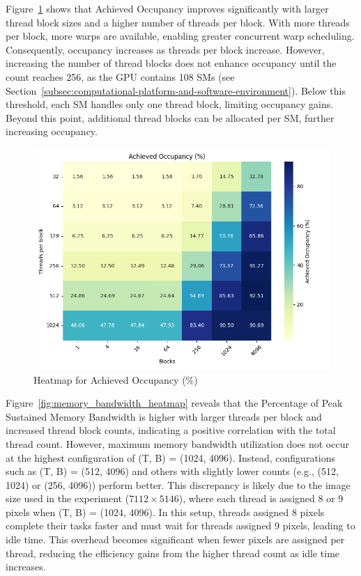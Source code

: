 Figure~\ref{fig:occupancy_heatmap} shows that Achieved Occupancy improves significantly with larger thread block sizes and a higher number of threads per block. With more threads per block, more warps are available, enabling greater concurrent warp scheduling. Consequently, occupancy increases as threads per block increase. However, increasing the number of thread blocks does not enhance occupancy until the count reaches 256, as the GPU contains 108 SMs (see Section~\ref{subsec:computational-platform-and-software-environment}). Below this threshold, each SM handles only one thread block, limiting occupancy gains. Beyond this point, additional thread blocks can be allocated per SM, further increasing occupancy.

\begin{figure}[htbp]
    \includegraphics[width=1.0\linewidth]{images/Achieved Occupancy.png}
    \caption{Heatmap for Achieved Occupancy (\%)}
    \label{fig:occupancy_heatmap}
\end{figure}


Figure~\ref{fig:memory_bandwidth_heatmap} reveals that the Percentage of Peak Sustained Memory Bandwidth is higher with larger threads per block and increased thread block counts, indicating a positive correlation with the total thread count. However, maximum memory bandwidth utilization does not occur at the highest configuration of (T, B) = (1024, 4096). Instead, configurations such as (T, B) = (512, 4096) and others with slightly lower counts (e.g., (512, 1024) or (256, 4096)) perform better. This discrepancy is likely due to the image size used in the experiment (\(7112 \times 5146\)), where each thread is assigned 8 or 9 pixels when (T, B) = (1024, 4096). In this setup, threads assigned 8 pixels complete their tasks faster and must wait for threads assigned 9 pixels, leading to idle time. This overhead becomes significant when fewer pixels are assigned per thread, reducing the efficiency gains from the higher thread count as idle time increases.

